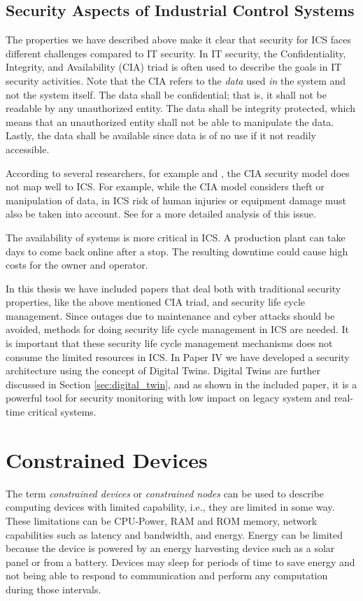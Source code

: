 \subsection{Security Aspects of Industrial Control Systems}
\label{subsec:ics_security}
The properties we have described above make it clear that security for ICS faces different challenges compared to IT security. In IT security, the Confidentiality, Integrity, and Availability (CIA) triad is often used \cite{perrin2008cia} to describe the goals in IT security activities. Note that the CIA refers to the \emph{data} used \emph{in} the system and not the system itself.
The data shall be confidential; that is, it shall not be readable by any unauthorized entity. The data shall be integrity protected, which means that an unauthorized entity shall not be able to manipulate the data. Lastly, the data shall be available since data is of no use if it not readily accessible. 

According to several researchers, for example \cite{Gollmann2016} and \cite{stouffer2011guide}, the CIA security model does not map well to ICS. For example, while the CIA model considers theft or manipulation of data, in ICS risk of human injuries or equipment damage must also be taken into account. See \cite{stouffer2011guide} for a more detailed analysis of this issue.

The availability of systems is more critical in ICS. A production plant can take days to come back online after a stop. The resulting downtime could cause high costs for the owner and operator. 

In this thesis we have included papers that deal both with traditional security properties, like the above mentioned CIA triad, and security life cycle management. Since outages due to maintenance and cyber attacks should be avoided, methods for doing security life cycle management in ICS are needed. It is important that these security life cycle management mechanisms does not consume the limited resources in ICS. In Paper IV we have developed a security architecture using the concept of Digital Twins. Digital Twins are further discussed in Section \ref{sec:digital_twin}, and as shown in the included paper, it is a powerful tool for security monitoring with low impact on legacy system and real-time critical systems.

\section{Constrained Devices}
\label{sec:constrained_devices}
The term \emph{constrained devices} or \emph{constrained nodes} can be used to describe computing devices with limited capability, i.e., they are limited in some way. These limitations can be CPU-Power, RAM and ROM memory, network capabilities such as latency and bandwidth, and energy. Energy can be limited because the device is powered by an energy harvesting device such as a solar panel or from a battery. Devices may sleep for periods of time to save energy and not being able to respond to communication and perform any computation during those intervals.

